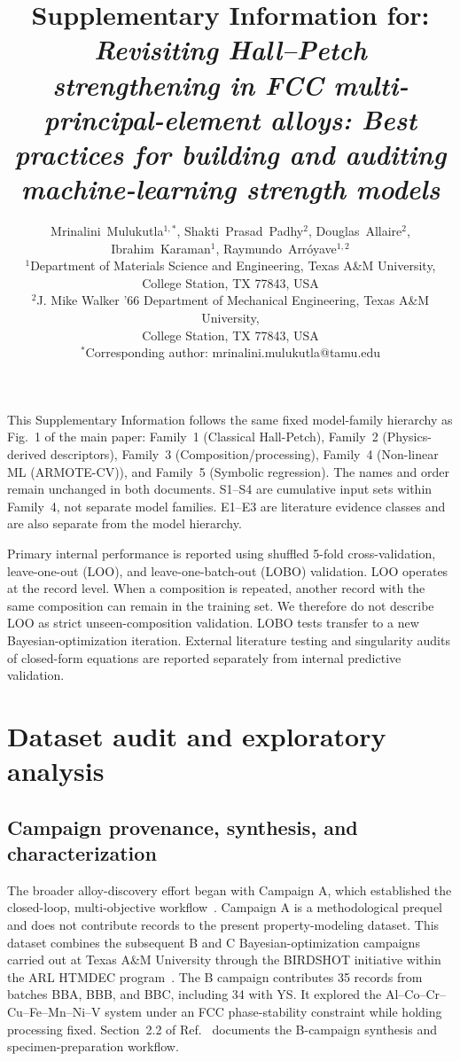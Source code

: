 \documentclass[a4paper,11pt]{article}
\title{Supplementary Information for:\\
\emph{Revisiting Hall--Petch strengthening in FCC multi-principal-element alloys: Best practices for building and auditing machine-learning strength models}}
\author{Mrinalini~Mulukutla$^{1,*}$, Shakti~Prasad~Padhy$^{2}$, Douglas~Allaire$^{2}$,\\
Ibrahim~Karaman$^{1}$, Raymundo~Arr\'{o}yave$^{1,2}$\\[0.5em]
\small $^{1}$Department of Materials Science and Engineering, Texas A\&M University,\\
\small College Station, TX 77843, USA\\
\small $^{2}$J. Mike Walker '66 Department of Mechanical Engineering, Texas A\&M University,\\
\small College Station, TX 77843, USA\\
\small $^{*}$Corresponding author: mrinalini.mulukutla@tamu.edu}
\date{}
\newcommand{\familyone}{Classical Hall-Petch}
\newcommand{\familytwo}{Physics-derived descriptors}
\newcommand{\familythree}{Composition/processing}
\newcommand{\familyfour}{Non-linear ML (ARMOTE-CV)}
\newcommand{\familyfive}{Symbolic regression}
\begin{document}
\maketitle
\begingroup
\sloppy
\tableofcontents
\endgroup

This Supplementary Information follows the same fixed model-family hierarchy as Fig.~1 of the main paper: Family~1 (\familyone), Family~2 (\familytwo), Family~3 (\familythree), Family~4 (\familyfour), and Family~5 (\familyfive). The names and order remain unchanged in both documents. S1--S4 are cumulative input sets within Family~4, not separate model families. E1--E3 are literature evidence classes and are also separate from the model hierarchy.

Primary internal performance is reported using shuffled 5-fold cross-validation, leave-one-out (LOO), and leave-one-batch-out (LOBO) validation. LOO operates at the record level. When a composition is repeated, another record with the same composition can remain in the training set. We therefore do not describe LOO as strict unseen-composition validation. LOBO tests transfer to a new Bayesian-optimization iteration. External literature testing and singularity audits of closed-form equations are reported separately from internal predictive validation.

\section{Dataset audit and exploratory analysis}
\label{si:data}

\subsection{Campaign provenance, synthesis, and characterization}

The broader alloy-discovery effort began with Campaign A, which established the closed-loop, multi-objective workflow~\cite{Hastings2025FCC}. Campaign A is a methodological prequel and does not contribute records to the present property-modeling dataset. This dataset combines the subsequent B and C Bayesian-optimization campaigns carried out at Texas A\&M University through the BIRDSHOT initiative within the ARL HTMDEC program~\cite{Mulukutla2024BIRDSHOT,Mulukutla2026BRAVE}. The B campaign contributes 35 records from batches BBA, BBB, and BBC, including 34 with YS. It explored the Al--Co--Cr--Cu--Fe--Mn--Ni--V system under an FCC phase-stability constraint while holding processing fixed. Section~2.2 of Ref.~\cite{Mulukutla2026BRAVE} documents the B-campaign synthesis and specimen-preparation workflow.
\end{document}
